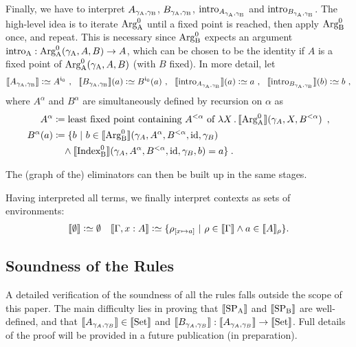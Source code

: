 \documentclass{article}
\begin{document}
Finally, we have to interpret $A_{\gamma_{\mathrm{A}}, \gamma_{\mathrm{B}}}$, $B_{\gamma_{\mathrm{A}}, \gamma_{\mathrm{B}}}$,
$\text{intro}_{A_{\gamma_{\mathrm{A}}, \gamma_{\mathrm{B}}}}$ and $\text{intro}_{B_{\gamma_{\mathrm{A}}, \gamma_{\mathrm{B}}}}$.  The high-level
idea is to iterate $\text{Arg}^{0}_{\mathrm{A}}$ until a fixed point is reached, then apply
$\text{Arg}^{0}_{\mathrm{B}}$ once, and repeat. This is necessary since $\text{Arg}^{0}_{\mathrm{B}}$ expects an
argument $\text{intro}_{\mathrm{A}} : \text{Arg}^{0}_{\mathrm{A}}(\gamma_{\mathrm{A}}, A, B) \to A$, which can be chosen
to be the identity if $A$ is a fixed point of $\text{Arg}^{0}_{\mathrm{A}}(\gamma_{\mathrm{A}}, A, B)$
(with $B$ fixed). In more detail, let
\begin{gather*}
\sem{A_{\gammaAB}} \colonsimeq A^{\cardz} \enspace\! , \quad\!\!
\sem{B_{\gammaAB}}(a) \colonsimeq B^{\cardz}(a)\enspace\! , \quad\!\!
\sem{\intro{A_{\gammaAB}}}(a) \colonsimeq a \enspace\! ,\quad\!\!
\sem{\intro{B_{\gammaAB}}}(b) \colonsimeq b \enspace\! ,\\
\end{gather*} \vskip -0.5cm \noindent 
where $A^{\alpha}$ and $B^{\alpha}$ are
simultaneously defined by recursion on $\alpha$ as
\begin{align*}
  A^{\alpha} & \coloneqq  \text{least fixed point containing $A^{< \alpha}$ of }
       \lambda X\,.\, \llbracket \text{Arg}^{0}_{\mathrm{A}} \rrbracket(\gamma_A, X, B^{< \alpha}) \enspace ,\\
  B^{\alpha}(a) & \coloneqq \{b\ |\ b \in \llbracket \text{Arg}^{0}_{\mathrm{B}} \rrbracket(\gamma_A, A^{\alpha},
  B^{< \alpha}, \text{id}, \gamma_B) \\
  & \quad \land \llbracket \text{Index}^{0}_{\mathrm{B}} \rrbracket(\gamma_A,
  A^{\alpha}, B^{< \alpha}, \text{id}, \gamma_B, b) = a \}\enspace \hspace{-2.47968pt} .
\end{align*}

The (graph of the) eliminators can then be built up in the same
stages.

Having interpreted all terms, we finally interpret contexts as sets of environments:
\begin{align*}
  \llbracket \emptyset \rrbracket \mathrel{\mathop:}\simeq \emptyset && \llbracket \Gamma, x : A \rrbracket \mathrel{\mathop:}\simeq \{
  \rho_{[x \mapsto a]} \ |\ \rho \in \llbracket \Gamma \rrbracket \land a \in \llbracket A \rrbracket_\rho\}.
\end{align*}

\subsection{Soundness of the Rules}

A detailed verification of the soundness of all the rules falls
outside the scope of this paper. The main difficulty lies in proving
that $\llbracket \text{SP}_{\mathrm{A}} \rrbracket$ and $\llbracket \text{SP}_{\mathrm{B}} \rrbracket$ are well-defined, and that
$\llbracket A_{\gamma_A, \gamma_B} \rrbracket \in \llbracket \text{Set} \rrbracket$ and $\llbracket B_{\gamma_A,
    \gamma_B} \rrbracket : \llbracket A_{\gamma_A, \gamma_B} \rrbracket \to \llbracket \text{Set} \rrbracket$. Full
details of the proof will be provided in a future publication (in
preparation).
\end{document}
